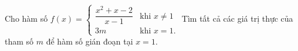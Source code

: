 \begin{ex}
Cho hàm số $f(x)=\begin{cases}\dfrac{x^2+x-2}{x-1}&\text{khi }x\ne1\\3m&\text{khi }x=1.\end{cases}$ Tìm tất cả các giá trị thực của tham số $m$ để hàm số gián đoạn tại $x=1$.
\end{ex}
